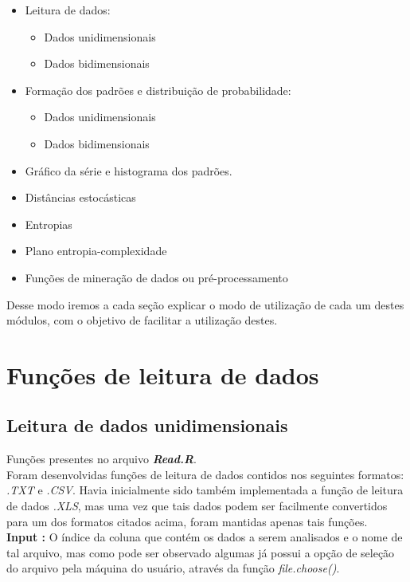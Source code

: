 \documentclass[12pt,letterpaper]{article}
\begin{document}
\begin{itemize}
\item Leitura de dados:
	\begin{itemize}
	\item Dados unidimensionais
    \item Dados bidimensionais
	\end{itemize}
\item Formação dos padrões e distribuição de probabilidade:
	\begin{itemize}
	\item Dados unidimensionais
    \item Dados bidimensionais
	\end{itemize}
\item Gráfico da série e histograma dos padrões.
\item Distâncias estocásticas
\item Entropias
\item Plano entropia-complexidade
\item Funções de mineração de dados ou pré-processamento
\end{itemize}


Desse modo iremos a cada seção explicar o modo de utilização de cada um destes módulos, com o objetivo de facilitar a utilização destes.


\section{Funções de leitura de dados}

\subsection{Leitura de dados unidimensionais}

Funções presentes no arquivo \textbf{\textit{Read.R}}.\\

Foram desenvolvidas funções de leitura de dados contidos nos seguintes formatos: \textit{.TXT} e \textit{.CSV}. Havia inicialmente sido também implementada a função de leitura de dados \textit{.XLS}, mas uma vez que tais dados podem ser facilmente convertidos para um dos formatos citados acima, foram mantidas apenas tais funções.\\

\textbf{Input :} O índice da coluna que contém os dados a serem analisados e o nome de tal arquivo, mas como pode ser observado algumas já possui a opção de seleção do arquivo pela máquina do usuário, através da função \textit{file.choose()}.
\end{document}
